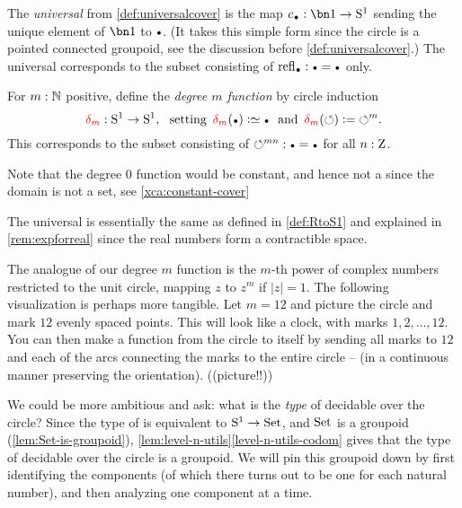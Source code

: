 \begin{example}\label{exa:univS1cover}
The \emph{universal} \covering from \cref{def:universalcover}
is the map $c_\base:\bn 1\to \Sc$ 
sending the unique element of $\bn 1$ to $\base$. 
(It takes this simple form since the circle is a pointed connected
groupoid, see the discussion before \cref{def:universalcover}.)
The universal \covering corresponds to the subset consisting 
of $\refl\base : \base=\base$ only.  
\end{example}

\begin{example}\label{exa:mfoldS1cover}
For $m:\mathbb{N}$ positive, define the \emph{degree $m$ function} by circle induction
\[
\dg{m}:\Sc\to \Sc, \text{~~setting~} 
\dg{m}(\base)\defeq\base \text{~~and~} 
\dg{m}(\Sloop)\defis{\Sloop}^m.
\]
This \covering corresponds to the subset consisting 
of ${\Sloop}^{mn} : \base=\base$ for all $n:\mathrm{Z}$.
\end{example}

Note that the degree $0$ function would be constant,
and hence not a \covering since the domain is not a set,
see \cref{xca:constant-cover}

\begin{remark}
  \label{rem:RtoS1}
The universal \covering is essentially the same as defined in \cref{def:RtoS1}
and explained in \cref{rem:expforreal}
since the real numbers form a contractible space.

\label{rem:finitecoveringsofS1}
The analogue of our degree $m$ function is the $m$-th power of complex numbers 
restricted to the unit circle, mapping $z$ to $z^m$ if $|z|=1$.  
The following visualization is perhaps more tangible.  
Let $m=12$ and picture the circle and mark $12$ evenly spaced points.
This will look like a clock, with marks $1,2,\dots,12$. 
You can then make a function from the circle to itself by sending 
all marks to $12$ and each of the arcs connecting the marks to the entire circle 
-- (in a continuous manner preserving the orientation).
  ((picture!!))
\end{remark}

We could be more ambitious and ask: what is the \emph{type} of decidable 
\coverings over the circle?  Since the type of \coverings is 
equivalent to ${\mathrm{S}^1}\to \mathrm{Set}$, and $\mathrm{Set}$ is a groupoid
(\cref{lem:Set-is-groupoid}),
\cref{lem:level-n-utils}\ref{level-n-utils-codom} gives
that the type of decidable \coverings over the circle is a groupoid.  
We will pin this groupoid down by first identifying the components 
(of which there turns out to be one for each natural number), 
and then analyzing one component at a time.

